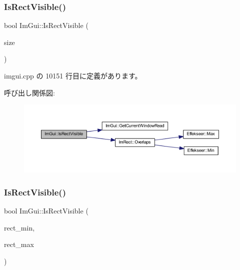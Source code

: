 \mbox{\label{namespace_im_gui_a578ead6237b3ed05497ed361f18d9f97}} 
\subsubsection{\texorpdfstring{Is\+Rect\+Visible()}{IsRectVisible()}\hspace{0.1cm}{\footnotesize\ttfamily [1/2]}}
{\footnotesize\ttfamily bool Im\+Gui\+::\+Is\+Rect\+Visible (\begin{DoxyParamCaption}\item[{const \mbox{\hyperlink{struct_im_vec2}{Im\+Vec2}} \&}]{size }\end{DoxyParamCaption})}



 imgui.\+cpp の 10151 行目に定義があります。

呼び出し関係図\+:\nopagebreak
\begin{figure}[H]
\begin{center}
\leavevmode
\includegraphics[width=350pt]{namespace_im_gui_a578ead6237b3ed05497ed361f18d9f97_cgraph}
\end{center}
\end{figure}
\mbox{\label{namespace_im_gui_a5aca7e6939e07caaca489aa8c776fd81}} 
\subsubsection{\texorpdfstring{Is\+Rect\+Visible()}{IsRectVisible()}\hspace{0.1cm}{\footnotesize\ttfamily [2/2]}}
{\footnotesize\ttfamily bool Im\+Gui\+::\+Is\+Rect\+Visible (\begin{DoxyParamCaption}\item[{const \mbox{\hyperlink{struct_im_vec2}{Im\+Vec2}} \&}]{rect\+\_\+min,  }\item[{const \mbox{\hyperlink{struct_im_vec2}{Im\+Vec2}} \&}]{rect\+\_\+max }\end{DoxyParamCaption})}




